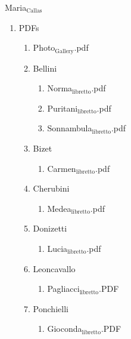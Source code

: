\documentclass[11pt]{article}
\begin{document}
\item Maria$_{\text{Callas}}$
\label{sec-1-1-1-1-31-9}
\begin{enumerate}
\item PDFs
\label{sec-1-1-1-1-31-9-1}
\begin{enumerate}
\item Photo$_{\text{Gallery}}$.pdf
\label{sec-1-1-1-1-31-9-1-1}

\item Bellini
\label{sec-1-1-1-1-31-9-1-2}
\begin{enumerate}
\item Norma$_{\text{libretto}}$.pdf
\label{sec-1-1-1-1-31-9-1-2-1}

\item Puritani$_{\text{libretto}}$.pdf
\label{sec-1-1-1-1-31-9-1-2-2}

\item Sonnambula$_{\text{libretto}}$.pdf
\label{sec-1-1-1-1-31-9-1-2-3}
\end{enumerate}

\item Bizet
\label{sec-1-1-1-1-31-9-1-3}
\begin{enumerate}
\item Carmen$_{\text{libretto}}$.pdf
\label{sec-1-1-1-1-31-9-1-3-1}
\end{enumerate}

\item Cherubini
\label{sec-1-1-1-1-31-9-1-4}
\begin{enumerate}
\item Medea$_{\text{libretto}}$.pdf
\label{sec-1-1-1-1-31-9-1-4-1}
\end{enumerate}

\item Donizetti
\label{sec-1-1-1-1-31-9-1-5}
\begin{enumerate}
\item Lucia$_{\text{libretto}}$.pdf
\label{sec-1-1-1-1-31-9-1-5-1}
\end{enumerate}

\item Leoncavallo
\label{sec-1-1-1-1-31-9-1-6}
\begin{enumerate}
\item Pagliacci$_{\text{libretto}}$.PDF
\label{sec-1-1-1-1-31-9-1-6-1}
\end{enumerate}

\item Ponchielli
\label{sec-1-1-1-1-31-9-1-7}
\begin{enumerate}
\item Gioconda$_{\text{libretto}}$.PDF
\label{sec-1-1-1-1-31-9-1-7-1}
\end{enumerate}


\end{enumerate}
\end{enumerate}
\end{document}
